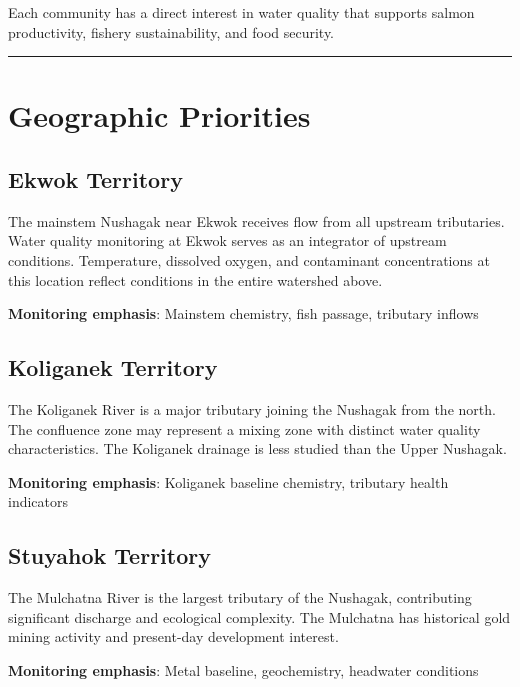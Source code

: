 \documentclass[
  letterpaper,
]{scrbook}
\begin{document}
Each community has a direct interest in water quality that supports
salmon productivity, fishery sustainability, and food security.

\begin{center}\rule{0.5\linewidth}{0.5pt}\end{center}

\section{Geographic Priorities}\label{geographic-priorities}

\subsection{Ekwok Territory}\label{ekwok-territory}

The mainstem Nushagak near Ekwok receives flow from all upstream
tributaries. Water quality monitoring at Ekwok serves as an integrator
of upstream conditions. Temperature, dissolved oxygen, and contaminant
concentrations at this location reflect conditions in the entire
watershed above.

\textbf{Monitoring emphasis}: Mainstem chemistry, fish passage,
tributary inflows

\subsection{Koliganek Territory}\label{koliganek-territory}

The Koliganek River is a major tributary joining the Nushagak from the
north. The confluence zone may represent a mixing zone with distinct
water quality characteristics. The Koliganek drainage is less studied
than the Upper Nushagak.

\textbf{Monitoring emphasis}: Koliganek baseline chemistry, tributary
health indicators

\subsection{Stuyahok Territory}\label{stuyahok-territory}

The Mulchatna River is the largest tributary of the Nushagak,
contributing significant discharge and ecological complexity. The
Mulchatna has historical gold mining activity and present-day
development interest.

\textbf{Monitoring emphasis}: Metal baseline, geochemistry, headwater
conditions
\end{document}
